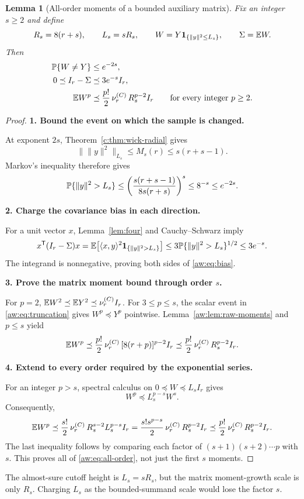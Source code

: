 \documentclass[11pt]{article}
\numberwithin{equation}{section}
\newtheorem{lemma}[theorem]{Lemma}
\theoremstyle{definition}\newtheorem{definition}[theorem]{Definition}
\theoremstyle{remark}\newtheorem{remark}[theorem]{Remark}
\newcommand{\norm}[1]{\lVert#1\rVert}\newcommand{\ip}[2]{\langle#1,#2\rangle}
\newcommand{\one}{\mathbf1}\newcommand{\F}{\mathrm F}
\newcommand{\step}[1]{\par\addvspace{.65\baselineskip}\Needspace{4\baselineskip}\noindent\textbf{#1}\par\nobreak\smallskip}
\begin{document}
\begin{lemma}[All-order moments of a bounded auxiliary matrix]\label{aw:lem:truncate}
Fix an integer $s\ge2$ and define
\begin{equation}\label{aw:eq:truncation}
 R_s=8(r+s),\qquad L_s=sR_s,\qquad
 W=Y\one_{\{\norm y^2\le L_s\}},\qquad\Sigma=\E W.
\end{equation}
Then
\begin{align}
 \mathbb P\{W\ne Y\}&\le e^{-2s},\label{aw:eq:clip}\\
 0\preceq I_r-\Sigma&\preceq3e^{-s}I_r,\label{aw:eq:bias}\\
 \mathbb E W^p&\preceq\frac{p!}{2}\,\nu_r^{(C)}\,R_s^{p-2}I_r
 \qquad\text{for every integer }p\ge2.\label{aw:eq:all-order}
\end{align}
\end{lemma}
\begin{proof}
\step{1. Bound the event on which the sample is changed.}
At exponent $2s$, Theorem~\ref{c:thm:wick-radial} gives
\[
 \bigl\|\norm y^2\bigr\|_{L_s}
 \le M_s(r)\le s(r+s-1).
\]
Markov's inequality therefore gives
\[
 \Prob\{\norm y^2>L_s\}
 \le\left(\frac{s(r+s-1)}{8s(r+s)}\right)^s
 \le8^{-s}\le e^{-2s}.
\]

\step{2. Charge the covariance bias in each direction.}
For a unit vector $x$, Lemma~\ref{lem:four} and Cauchy--Schwarz imply
\[
 x^{\mathsf T}(I_r-\Sigma)x
 =\E\bigl[\ip{x}{y}^2\one_{\{\norm y^2>L_s\}}\bigr]
 \le3\Prob\{\norm y^2>L_s\}^{1/2}\le3e^{-s}.
\]
The integrand is nonnegative, proving both sides of \eqref{aw:eq:bias}.

\step{3. Prove the matrix moment bound through order $s$.}
For $p=2$, $\mathbb E W^2\preceq\mathbb E Y^2\preceq\nu_r^{(C)}I_r$.
For $3\le p\le s$, the scalar event in \eqref{aw:eq:truncation} gives
$W^p\preceq Y^p$ pointwise. Lemma~\ref{aw:lem:raw-moments} and $p\le s$ yield
\[
 \mathbb E W^p\preceq\frac{p!}{2}\,\nu_r^{(C)}\,[8(r+p)]^{p-2}I_r
 \preceq\frac{p!}{2}\,\nu_r^{(C)}\,R_s^{p-2}I_r.
\]

\step{4. Extend to every order required by the exponential series.}
For an integer $p>s$, spectral calculus on $0\preceq W\preceq L_sI_r$ gives
\[
 W^p\preceq L_s^{p-s}W^s.
\]
Consequently,
\[
 \mathbb E W^p\preceq\frac{s!}{2}\,\nu_r^{(C)}\,R_s^{s-2}L_s^{p-s}I_r
 =\frac{s!s^{p-s}}{2}\,\nu_r^{(C)}\,R_s^{p-2}I_r
 \preceq\frac{p!}{2}\,\nu_r^{(C)}\,R_s^{p-2}I_r.
\]
The last inequality follows by comparing each factor of
$(s+1)(s+2)\cdots p$ with $s$. This proves all of \eqref{aw:eq:all-order},
not just the first $s$ moments.
\end{proof}
\begin{takeaway}
The almost-sure cutoff height is $L_s=sR_s$, but the matrix moment-growth scale is
only $R_s$. Charging $L_s$ as the bounded-summand scale would lose the factor $s$.
\end{takeaway}
\end{document}

